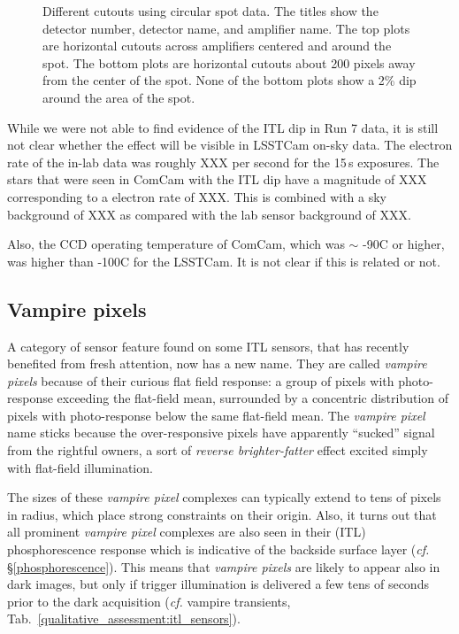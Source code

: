 \begin{figure}
\caption{Different cutouts using circular spot data. The titles show the detector number, detector name, and amplifier name. The top plots are horizontal cutouts across amplifiers centered and around the spot. The bottom plots are horizontal cutouts about 200 pixels away from the center of the spot. None of the bottom plots show a 2\% dip around the area of the spot.}
\label{fig:ITLDip_Spots}
\end{figure}

While we were not able to find evidence of the ITL dip in Run 7 data, it
is still not clear whether the effect will be visible in LSSTCam on-sky data.
The electron rate of the in-lab data was roughly XXX per second for the 15\,s exposures. The stars that were seen in ComCam with the ITL dip
have a magnitude of XXX corresponding to a electron rate of XXX. This is
combined with a sky background of XXX as compared with the lab sensor
background of XXX.

Also, the CCD operating temperature of ComCam, which was $\sim$ -90C or higher, was higher than -100C for the LSSTCam. It is not clear if this is related or not.

\subsection{Vampire pixels}\label{vampire-pixels}

A category of sensor feature found on some ITL sensors, that has recently benefited from fresh attention, now has a new name. They are called {\it vampire pixels} because of their curious flat field response: a group of pixels with photo-response exceeding the flat-field mean, surrounded by a concentric distribution of pixels with photo-response below the same flat-field mean. The {\it vampire pixel} name sticks because the over-responsive pixels have apparently ``sucked'' signal from the rightful owners, a sort of {\it reverse brighter-fatter} effect excited simply with flat-field illumination. 

The sizes of these {\it vampire pixel} complexes can typically extend to tens of pixels in radius, which place strong constraints on their origin. Also, it turns out that all prominent {\it vampire pixel} complexes are also seen in their (ITL) phosphorescence response which is indicative of the backside surface layer ({\it cf.} \S\ref{phosphorescence}). This means that {\it vampire pixels} are likely to appear also in dark images, but only if trigger illumination is delivered a few tens of seconds prior to the dark acquisition ({\it cf.} vampire transients, Tab.~\ref{qualitative_assessment:itl_sensors}).

